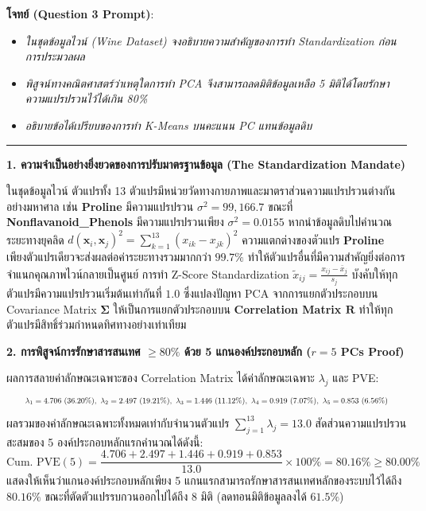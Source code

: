 \documentclass[12pt,a4paper]{article}
\newcommand{\codevar}[1]{\textcolor{codeaccent}{\textbf{#1}}}
\begin{document}
\begin{ansbox}[unbreakable, fontupper={\fontsize{9.6pt}{12.6pt}\selectfont}, left=6pt, right=6pt, top=3pt, bottom=3pt]
\textbf{โจทย์ (Question 3 Prompt)}:
\begin{itemize}[leftmargin=1.2em, itemsep=0pt, topsep=0pt, parsep=0pt]
    \item[(a)] \textit{ในชุดข้อมูลไวน์ (Wine Dataset) จงอธิบายความสำคัญของการทำ Standardization ก่อนการประมวลผล}
    \item[(b)] \textit{พิสูจน์ทางคณิตศาสตร์ว่าเหตุใดการทำ PCA จึงสามารถลดมิติข้อมูลเหลือ 5 มิติได้โดยรักษาความแปรปรวนไว้ได้เกิน 80\%}
    \item[(c)] \textit{อธิบายข้อได้เปรียบของการทำ K-Means บนคะแนน PC แทนข้อมูลดิบ}
\end{itemize}

\vspace{-0.2em}
\noindent\rule{\linewidth}{0.4pt}
\vspace{-0.2em}

\noindent\textbf{\normalsize 1. ความจำเป็นอย่างยิ่งยวดของการปรับมาตรฐานข้อมูล (The Standardization Mandate)}\par\vspace{0.05em}
ในชุดข้อมูลไวน์ ตัวแปรทั้ง 13 ตัวแปรมีหน่วยวัดทางกายภาพและมาตราส่วนความแปรปรวนต่างกันอย่างมหาศาล เช่น \codevar{Proline} มีความแปรปรวน $\sigma^2 = 99,166.7$ ขณะที่ \codevar{Nonflavanoid\_Phenols} มีความแปรปรวนเพียง $\sigma^2 = 0.0155$ หากนำข้อมูลดิบไปคำนวณระยะทางยุคลิด $d(\mathbf{x}_i, \mathbf{x}_j)^2 = \sum_{k=1}^{13} (x_{ik} - x_{jk})^2$ ความแตกต่างของตัวแปร \codevar{Proline} เพียงตัวแปรเดียวจะส่งผลต่อค่าระยะทางรวมมากกว่า $99.7\%$ ทำให้ตัวแปรอื่นที่มีความสำคัญยิ่งต่อการจำแนกคุณภาพไวน์กลายเป็นศูนย์ การทำ Z-Score Standardization $\tilde{x}_{ij} = \frac{x_{ij} - \bar{x}_j}{s_j}$ บังคับให้ทุกตัวแปรมีความแปรปรวนเริ่มต้นเท่ากันที่ $1.0$ ซึ่งแปลงปัญหา PCA จากการแยกตัวประกอบบน Covariance Matrix $\boldsymbol{\Sigma}$ ให้เป็นการแยกตัวประกอบบน \textbf{Correlation Matrix $\mathbf{R}$} ทำให้ทุกตัวแปรมีสิทธิ์ร่วมกำหนดทิศทางอย่างเท่าเทียม

\vspace{0.15em}
\noindent\textbf{\normalsize 2. การพิสูจน์การรักษาสารสนเทศ $\ge 80\%$ ด้วย 5 แกนองค์ประกอบหลัก ($r=5$ PCs Proof)}\par\vspace{0.05em}
ผลการสลายค่าลักษณะเฉพาะของ Correlation Matrix ได้ค่าลักษณะเฉพาะ $\lambda_j$ และ PVE:
\begin{equation*}
    \resizebox{0.95\linewidth}{!}{$\lambda_1 = 4.706 \ (36.20\%), \ \lambda_2 = 2.497 \ (19.21\%), \ \lambda_3 = 1.446 \ (11.12\%), \ \lambda_4 = 0.919 \ (7.07\%), \ \lambda_5 = 0.853 \ (6.56\%)$}
\end{equation*}
ผลรวมของค่าลักษณะเฉพาะทั้งหมดเท่ากับจำนวนตัวแปร $\sum_{j=1}^{13} \lambda_j = 13.0$ สัดส่วนความแปรปรวนสะสมของ 5 องค์ประกอบหลักแรกคำนวณได้ดังนี้:
\begin{equation*}
    \text{Cum. PVE}(5) = \frac{4.706 + 2.497 + 1.446 + 0.919 + 0.853}{13.0} \times 100\% = \mathbf{80.16\%} \ge 80.00\%
\end{equation*}
แสดงให้เห็นว่าแกนองค์ประกอบหลักเพียง 5 แกนแรกสามารถรักษาสารสนเทศหลักของระบบไว้ได้ถึง $80.16\%$ ขณะที่ตัดตัวแปรรบกวนออกไปได้ถึง $8$ มิติ (ลดทอนมิติข้อมูลลงได้ $61.5\%$)


\end{ansbox}
\end{document}
